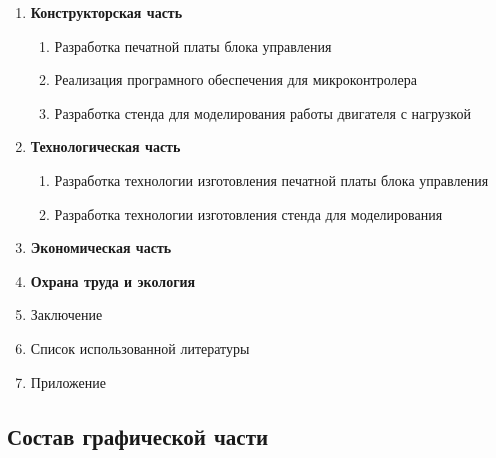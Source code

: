 \begin{enumerate}
\begin{enumerate}
        \end{enumerate}
    \item \textbf{Конструкторская часть}
        \begin{enumerate}
            \item Разработка печатной платы блока управления
            \item Реализация програмного обеспечения для микроконтролера
            \item Разработка стенда для моделирования работы двигателя с нагрузкой
        \end{enumerate}
    \item \textbf{Технологическая часть}
        \begin{enumerate}
            \item Разработка технологии изготовления печатной платы блока управления
            \item Разработка технологии изготовления стенда для моделирования
        \end{enumerate}
    \item \textbf{Экономическая часть}
    \item \textbf{Охрана труда и экология}
    \item{Заключение}
    \item{Список использованной литературы}
    \item{Приложение}
\end{enumerate}

\newpage
\subsection{Состав графической части}

